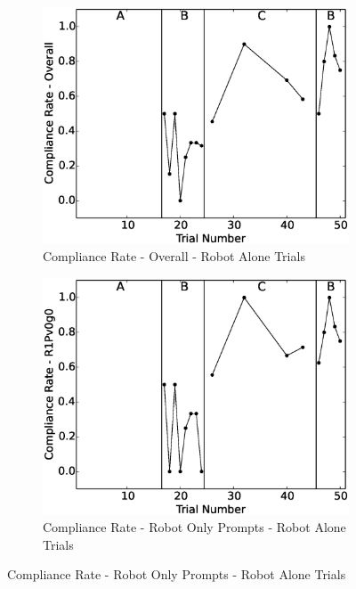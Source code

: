\begin{figure}[h]
	\centering
	\begin{subfigure}[b]{0.49\textwidth}
		\includegraphics[width=1.1\linewidth]{./img/data_analysis/102ComplianceRate-Overall_robotAloneOnly.eps}
		\caption{Compliance Rate - Overall - Robot Alone Trials}
		\label{fig:102ComplianceRate-Overall_robotAloneOnly}
	\end{subfigure}
	\hfill
	\begin{subfigure}[b]{0.49\textwidth}
		\includegraphics[width=1.1\linewidth]{./img/data_analysis/79ComplianceRate-R1Pv0g0_robotAloneOnly.eps}
		\caption{Compliance Rate - Robot Only Prompts - Robot Alone Trials}
		\label{fig:79ComplianceRate-R1Pv0g0_robotAloneOnly}
	\end{subfigure}%
	

\end{figure}
